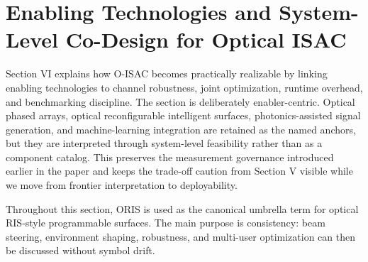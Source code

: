 \section{Enabling Technologies and System-Level Co-Design for Optical ISAC}
\label{sec:enablers}

Section VI explains how O-ISAC becomes practically realizable by linking enabling technologies to channel robustness, joint optimization, runtime overhead, and benchmarking discipline. The section is deliberately enabler-centric. Optical phased arrays, optical reconfigurable intelligent surfaces, photonics-assisted signal generation, and machine-learning integration are retained as the named anchors, but they are interpreted through system-level feasibility rather than as a component catalog. This preserves the measurement governance introduced earlier in the paper and keeps the trade-off caution from Section V visible while we move from frontier interpretation to deployability.

Throughout this section, ORIS is used as the canonical umbrella term for optical RIS-style programmable surfaces. The main purpose is consistency: beam steering, environment shaping, robustness, and multi-user optimization can then be discussed without symbol drift.

